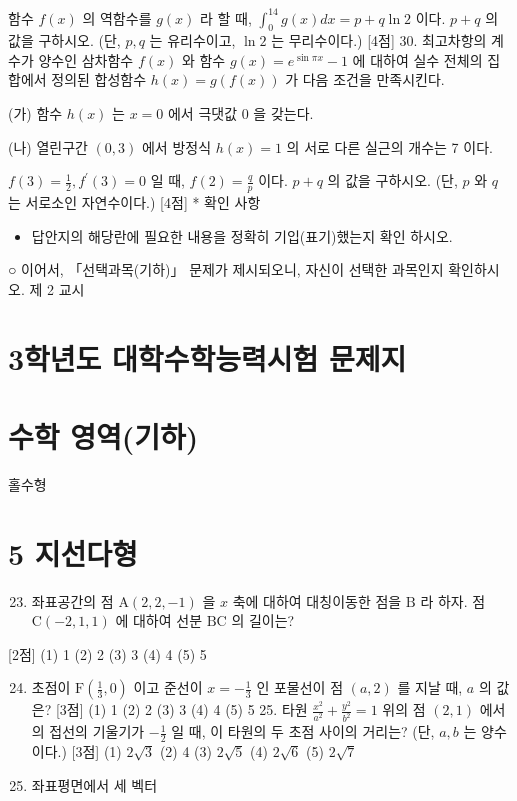 \documentclass[10pt]{article}
\begin{document}
함수 $f(x)$ 의 역함수를 $g(x)$ 라 할 때, $\int_{0}^{14} g(x) d x=p+q \ln 2$ 이다. $p+q$ 의 값을 구하시오. (단, $p, q$ 는 유리수이고, $\ln 2$ 는 무리수이다.) [4점] 30. 최고차항의 계수가 양수인 삼차함수 $f(x)$ 와 함수 $g(x)=e^{\sin \pi x}-1$ 에 대하여 실수 전체의 집합에서 정의된 합성함수 $h(x)=g(f(x))$ 가 다음 조건을 만족시킨다.

(가) 함수 $h(x)$ 는 $x=0$ 에서 극댓값 0 을 갖는다.

(나) 열린구간 $(0,3)$ 에서 방정식 $h(x)=1$ 의 서로 다른 실근의 개수는 7 이다.

$f(3)=\frac{1}{2}, f^{\prime}(3)=0$ 일 때, $f(2)=\frac{q}{p}$ 이다. $p+q$ 의 값을 구하시오. (단, $p$ 와 $q$ 는 서로소인 자연수이다.) [4점] * 확인 사항

\begin{itemize}
  \item 답안지의 해당란에 필요한 내용을 정확히 기입(표기)했는지 확인 하시오.
\end{itemize}

○ 이어서, 「선택과목(기하)」 문제가 제시되오니, 자신이 선택한 과목인지 확인하시오. 제 2 교시

\section{3학년도 대학수학능력시험 문제지}
\section{수학 영역(기하)}
홀수형

\section{5 지선다형}
\begin{enumerate}
  \setcounter{enumi}{22}
  \item 좌표공간의 점 $\mathrm{A}(2,2,-1)$ 을 $x$ 축에 대하여 대칭이동한 점을 $\mathrm{B}$ 라 하자. 점 $\mathrm{C}(-2,1,1)$ 에 대하여 선분 $\mathrm{BC}$ 의 길이는?
\end{enumerate}

[2점]
(1) 1
(2) 2
(3) 3
(4) 4
(5) 5

\begin{enumerate}
  \setcounter{enumi}{23}
  \item 초점이 $\mathrm{F}\left(\frac{1}{3}, 0\right)$ 이고 준선이 $x=-\frac{1}{3}$ 인 포물선이 점 $(a, 2)$ 를 지날 때, $a$ 의 값은? [3점]
(1) 1
(2) 2
(3) 3
(4) 4
(5) 5 25. 타원 $\frac{x^{2}}{a^{2}}+\frac{y^{2}}{b^{2}}=1$ 위의 점 $(2,1)$ 에서의 접선의 기울기가 $-\frac{1}{2}$ 일 때, 이 타원의 두 초점 사이의 거리는? (단, $a, b$ 는 양수이다.) [3점]
(1) $2 \sqrt{3}$
(2) 4
(3) $2 \sqrt{5}$
(4) $2 \sqrt{6}$
(5) $2 \sqrt{7}$

  \item 좌표평면에서 세 벡터

\end{enumerate}
\end{document}
